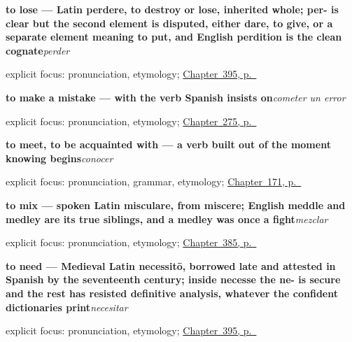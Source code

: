 \noindent\begin{minipage}[t]{\linewidth}
\raggedright
\textbf{to lose — Latin perdere, to destroy or lose, inherited whole; per- is clear but the second element is disputed, either dare, to give, or a separate element meaning to put, and English perdition is the clean cognate}\enspace\emph{perder}\par
\footnotesize explicit focus: pronunciation, etymology; \hyperref[ch:entrar-y-volver]{Chapter~395, p.~\pageref*{ch:entrar-y-volver}}
\end{minipage}\par\smallskip

\noindent\begin{minipage}[t]{\linewidth}
\raggedright
\textbf{to make a mistake — with the verb Spanish insists on}\enspace\emph{cometer un error}\par
\footnotesize explicit focus: pronunciation, etymology; \hyperref[ch:matices]{Chapter~275, p.~\pageref*{ch:matices}}
\end{minipage}\par\smallskip

\noindent\begin{minipage}[t]{\linewidth}
\raggedright
\textbf{to meet, to be acquainted with — a verb built out of the moment knowing begins}\enspace\emph{conocer}\par
\footnotesize explicit focus: pronunciation, grammar, etymology; \hyperref[ch:spanish-conocer]{Chapter~171, p.~\pageref*{ch:spanish-conocer}}
\end{minipage}\par\smallskip

\noindent\begin{minipage}[t]{\linewidth}
\raggedright
\textbf{to mix — spoken Latin misculare, from miscere; English meddle and medley are its true siblings, and a medley was once a fight}\enspace\emph{mezclar}\par
\footnotesize explicit focus: pronunciation, etymology; \hyperref[ch:usar-y-tocar]{Chapter~385, p.~\pageref*{ch:usar-y-tocar}}
\end{minipage}\par\smallskip

\noindent\begin{minipage}[t]{\linewidth}
\raggedright
\textbf{to need — Medieval Latin necessitō, borrowed late and attested in Spanish by the seventeenth century; inside necesse the ne- is secure and the rest has resisted definitive analysis, whatever the confident dictionaries print}\enspace\emph{necesitar}\par
\footnotesize explicit focus: pronunciation, etymology; \hyperref[ch:entrar-y-volver]{Chapter~395, p.~\pageref*{ch:entrar-y-volver}}
\end{minipage}\par\smallskip

